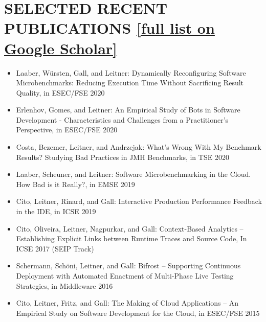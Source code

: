 \documentclass[paper=letter,fontsize=11pt]{scrartcl} %
\newcommand{\NewPart}[2]{\section*{\uppercase{#1} #2}}
\begin{document}

\NewPart{Selected Recent Publications}{\href{https://scholar.google.ch/citations?user=wZ9f8CAAAAAJ}{[full list on Google Scholar]}}


\begin{itemize}
\item Laaber,  Würsten, Gall, and Leitner: Dynamically Reconfiguring Software Microbenchmarks: Reducing Execution Time Without Sacrificing Result Quality, in ESEC/FSE 2020
\item Erlenhov,  Gomes, and Leitner: An Empirical Study of Bots in Software Development - Characteristics and Challenges from a Practitioner's Perspective, in ESEC/FSE  2020
\item Costa, Bezemer, Leitner, and  Andrzejak: What’s Wrong With My Benchmark Results? Studying Bad Practices in JMH Benchmarks, in TSE 2020
\item  Laaber, Scheuner, and Leitner: Software Microbenchmarking in the Cloud. How Bad is it Really?, in EMSE 2019
\item Cito, Leitner, Rinard, and Gall: Interactive Production Performance Feedback in the IDE, in ICSE 2019
\item Cito, Oliveira, Leitner, Nagpurkar, and Gall: Context-Based Analytics – Establishing Explicit Links between Runtime Traces and Source Code, In ICSE 2017 (SEIP Track)
\item Schermann, Sch\"oni, Leitner, and Gall: Bifrost -- Supporting Continuous Deployment with Automated Enactment of Multi-Phase Live Testing Strategies, in Middleware 2016
\item Cito, Leitner, Fritz, and Gall: The Making of Cloud Applications -- An Empirical Study on Software Development for the Cloud, in ESEC/FSE 2015
\end{itemize}
\end{document}
